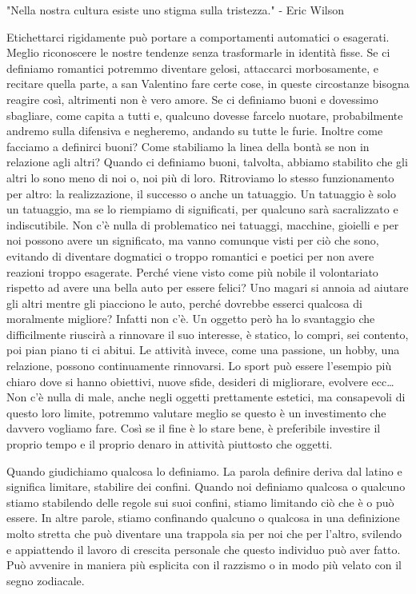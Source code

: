 \documentclass[12pt]{book} %
\begin{document}
"Nella nostra cultura esiste uno stigma sulla tristezza." - Eric Wilson

Etichettarci rigidamente può portare a comportamenti automatici o esagerati. Meglio riconoscere le nostre tendenze senza trasformarle in identità fisse.
Se ci definiamo romantici potremmo diventare gelosi, attaccarci morbosamente, e recitare quella parte, a san Valentino fare certe cose, in queste circostanze bisogna reagire così, altrimenti non è vero amore. Se ci definiamo buoni e dovessimo sbagliare, come capita a tutti e, qualcuno dovesse farcelo nuotare, probabilmente andremo sulla difensiva e negheremo, andando su tutte le furie. 
Inoltre come facciamo a definirci buoni? Come stabiliamo la linea della bontà se non in relazione agli altri? Quando ci definiamo buoni, talvolta, abbiamo stabilito che gli altri lo sono meno di noi o, noi più di loro. Ritroviamo lo stesso funzionamento per altro: la realizzazione, il successo o anche un tatuaggio. Un tatuaggio è solo un tatuaggio, ma se lo riempiamo di significati, per qualcuno sarà sacralizzato e indiscutibile. Non c'è nulla di problematico nei tatuaggi, macchine, gioielli e per noi possono avere un significato, ma vanno comunque visti per ciò che sono, evitando di diventare dogmatici o troppo romantici e poetici per non avere reazioni troppo esagerate.
Perché viene visto come più nobile il volontariato rispetto ad avere una bella auto per essere felici? Uno magari si annoia ad aiutare gli altri mentre gli piacciono le auto, perché dovrebbe esserci qualcosa di moralmente migliore? Infatti non c'è.
Un oggetto però ha lo svantaggio che difficilmente riuscirà a rinnovare il suo interesse, è statico, lo compri, sei contento, poi pian piano ti ci abitui. Le attività invece, come una passione, un hobby, una relazione, possono continuamente rinnovarsi. Lo sport può essere l'esempio più chiaro dove si hanno obiettivi, nuove sfide, desideri di migliorare, evolvere ecc… Non c'è nulla di male, anche negli oggetti prettamente estetici, ma consapevoli di questo loro limite, potremmo valutare meglio se questo è un investimento che davvero vogliamo fare. Così se il fine è lo stare bene, è preferibile investire il proprio tempo e il proprio denaro in attività piuttosto che oggetti.

Quando giudichiamo qualcosa lo definiamo. La parola definire deriva dal latino e significa limitare, stabilire dei
confini. Quando noi definiamo qualcosa o qualcuno stiamo stabilendo delle regole sui suoi confini, stiamo limitando ciò
che è o può essere. In altre parole, stiamo confinando qualcuno o qualcosa in una definizione molto stretta che può diventare una 
trappola sia per noi che per l'altro, svilendo e appiattendo il lavoro di crescita personale che questo individuo può aver fatto.
Può avvenire in maniera più esplicita con il razzismo o in modo più velato con il segno zodiacale.
\end{document}
